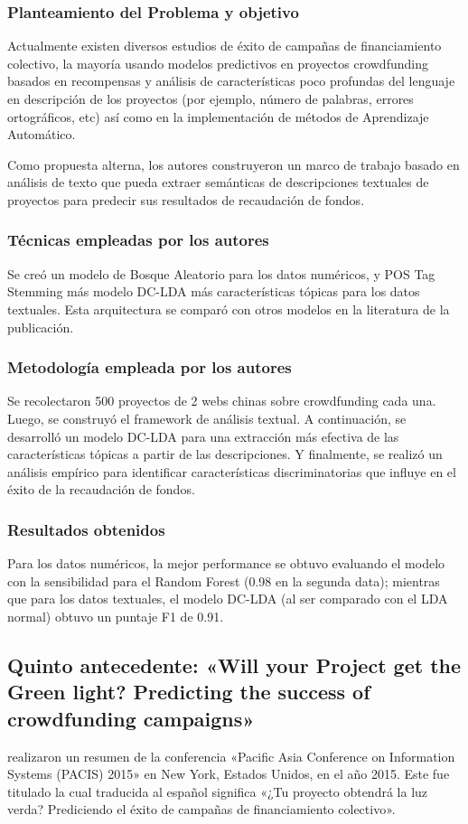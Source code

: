 \subsubsection{Planteamiento del Problema y objetivo}
Actualmente existen diversos estudios de éxito de campañas de financiamiento colectivo, la mayoría usando modelos predictivos en proyectos crowdfunding basados en recompensas y análisis de características poco profundas del lenguaje en descripción de los proyectos (por ejemplo, número de palabras, errores ortográficos, etc) así como en la implementación de métodos de Aprendizaje Automático.

Como propuesta alterna, los autores construyeron un marco de trabajo basado en análisis de texto que pueda extraer semánticas de descripciones textuales de proyectos para predecir sus resultados de recaudación de fondos.

\subsubsection{Técnicas empleadas por los autores}
Se creó un modelo de Bosque Aleatorio para los datos numéricos, y POS Tag Stemming más modelo DC-LDA más características tópicas para los datos textuales. Esta arquitectura se comparó con otros modelos en la literatura de la publicación.

\subsubsection{Metodología empleada por los autores}
Se recolectaron 500 proyectos de 2 webs chinas sobre crowdfunding cada una. Luego, se construyó el framework de análisis textual. A continuación, se desarrolló un modelo DC-LDA para una extracción más efectiva de las características tópicas a partir de las descripciones. Y finalmente, se realizó un análisis empírico para identificar características discriminatorias que influye en el éxito de la recaudación de fondos.

\subsubsection{Resultados obtenidos}
Para los datos numéricos, la mejor performance se obtuvo evaluando el modelo con la sensibilidad para el Random Forest (0.98 en la segunda data); mientras que para los datos textuales, el modelo DC-LDA (al ser comparado con el LDA normal) obtuvo un puntaje F1 de 0.91.


\subsection{Quinto antecedente: «Will your Project get the Green light? Predicting the success of crowdfunding campaigns» \citep*{pr_chen2015predcrowd}}
\citeauthor{pr_chen2015predcrowd} realizaron un resumen de la conferencia «Pacific Asia Conference on Information Systems (PACIS) 2015» en New York, Estados Unidos, en el año 2015. Este fue titulado  la cual traducida al español significa «¿Tu proyecto obtendrá la luz verda? Prediciendo el éxito de campañas de financiamiento colectivo».


